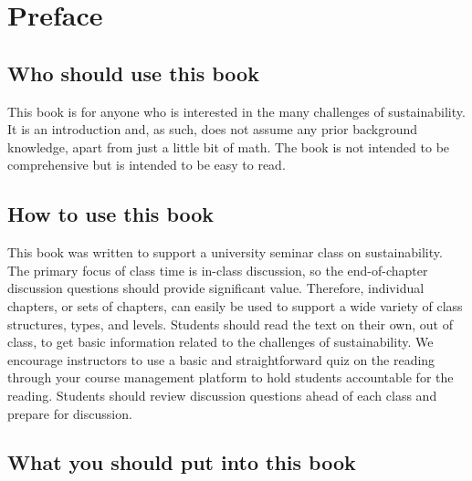 {
\chapter*{Preface}
\thispagestyle{plain}

\noindent


\section*{Who should use this book} 

This book is for anyone who is interested in the many challenges of 
sustainability.
It is an introduction and, as such, does not assume any prior background knowledge,
apart from just a little bit of math.
The book is not intended to be comprehensive but is intended to be easy to read.


\section*{How to use this book} 

This book was written to support a university seminar class %
on sustainability. The primary focus of class time is in-class discussion, so 
the end-of-chapter discussion questions should provide significant value. 
Therefore, individual chapters, or sets of chapters, can easily be
used to support a wide variety of class structures, types, and levels.
Students should read the text on their own, out of class, to get 
basic information related to  the challenges of sustainability. 
We encourage instructors to use a basic and straightforward quiz on the reading 
through your course management platform to hold students accountable for the 
reading. 
Students should review discussion questions ahead of each class and 
prepare for discussion.


\section*{What you should put into this book} 

}
